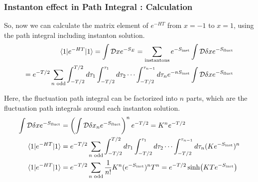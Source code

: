 \documentclass[10pt]{beamer}
\begin{document}
\begin{frame}
    \frametitle{Instanton effect in Path Integral : Calculation}

    So, now we can calculate the matrix element of $e^{-HT}$ from $x = -1$ to $x = 1$, using the path integral including instanton solution.
    \begin{align*}
    \small
    \langle 1 | e^{-HT} | 1 \rangle = \int \mathcal{D}x e^{-S_E} = \sum_{\text{instantons}} e^{-S_{\text{inst}}} \int \mathcal{D}\delta x e^{-S_{\text{fluct}}} \\
    = e^{-T/2} \sum_{n \text{ odd}} \int_{-T/2}^{T/2} d\tau_1 \int_{-T/2}^{\tau_1} d\tau_2 \cdots \int_{-T/2}^{\tau_{n-1}} d\tau_n e^{-nS_{\text{inst}}} \int \mathcal{D}\delta x e^{-S_{\text{fluct}}} 
    \end{align*}


Here, the fluctuation path integral can be factorized into $n$ parts, which are the fluctuation path integrals around each instanton solution.
\begin{align*}
\small
\int \mathcal{D}\delta x e^{-S_{\text{fluct}}} &= \left(\int \mathcal{D}\delta x_n e^{-S_{\text{fluct}}}\right)^n e^{-T/2}= K^n e^{-T/2} \\
    \langle 1 | e^{-HT} | 1 \rangle &= e^{-T/2} \sum_{n \text{ odd}} \int_{-T/2}^{T/2} d\tau_1 \int_{-T/2}^{\tau_1} d\tau_2 \cdots \int_{-T/2}^{\tau_{n-1}} d\tau_n (Ke^{-S_{\text{inst}}})^n \\
    \langle 1 | e^{-HT} | 1 \rangle &=e^{-T/2} \sum_{n \text{ odd}} \frac{1}{n!} K^n(e^{-S_{\text{inst}}})^n T^n = e^{-T/2} \sinh(KTe^{-S_{\text{inst}}}) \\
\end{align*}
\end{frame}
\end{document}
